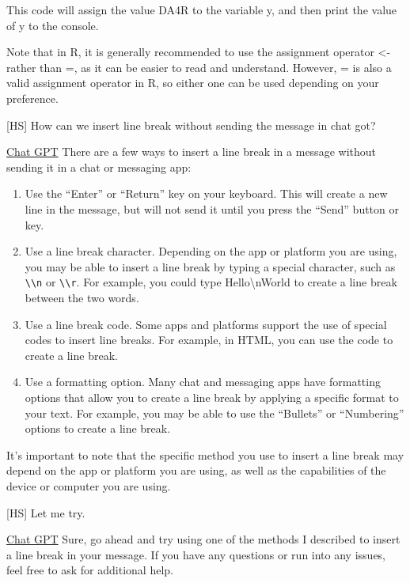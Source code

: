 \documentclass[
]{book}
\providecommand{\tightlist}{%
  \setlength{\itemsep}{0pt}\setlength{\parskip}{0pt}}
\theoremstyle{definition}
\theoremstyle{definition}
\theoremstyle{definition}
\theoremstyle{definition}
\theoremstyle{remark}
\begin{document}
This code will assign the value DA4R to the variable y, and then print the value of y to the console.

Note that in R, it is generally recommended to use the assignment operator \textless- rather than =, as it can be easier to read and understand. However, = is also a valid assignment operator in R, so either one can be used depending on your preference.

{[}HS{]} How can we insert line break without sending the message in chat got?

\protect\hyperlink{chatgpt}{Chat GPT} There are a few ways to insert a line break in a message without sending it in a chat or messaging app:

\begin{enumerate}
\def\labelenumi{\arabic{enumi}.}
\tightlist
\item
  Use the ``Enter'' or ``Return'' key on your keyboard. This will create a new line in the message, but will not send it until you press the ``Send'' button or key.
\item
  Use a line break character. Depending on the app or platform you are using, you may be able to insert a line break by typing a special character, such as \texttt{\textbackslash{}\textbackslash{}n} or \texttt{\textbackslash{}\textbackslash{}r}. For example, you could type Hello\textbackslash nWorld to create a line break between the two words.
\item
  Use a line break code. Some apps and platforms support the use of special codes to insert line breaks. For example, in HTML, you can use the code to create a line break.
\item
  Use a formatting option. Many chat and messaging apps have formatting options that allow you to create a line break by applying a specific format to your text. For example, you may be able to use the ``Bullets'' or ``Numbering'' options to create a line break.
\end{enumerate}

It's important to note that the specific method you use to insert a line break may depend on the app or platform you are using, as well as the capabilities of the device or computer you are using.

{[}HS{]} Let me try.

\protect\hyperlink{chatgpt}{Chat GPT} Sure, go ahead and try using one of the methods I described to insert a line break in your message. If you have any questions or run into any issues, feel free to ask for additional help.
\end{document}

